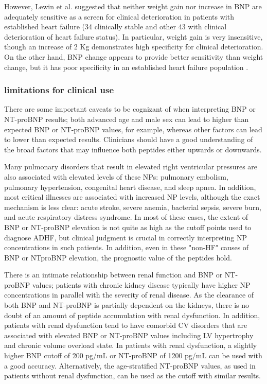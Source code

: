 \documentclass[14pt,a4paper,onecolumn]{extarticle}
\begin{document}
However, Lewin et al.  suggested that neither weight gain nor increase in BNP are adequately sensitive as a screen for clinical deterioration in patients with established heart failure (34 clinically stable and other 43 with clinical deterioration of heart failure status). In particular, weight gain is very insensitive, though an increase of 2 Kg demonstrates high specificity for clinical deterioration. On the other hand, BNP change appears to provide better sensitivity than weight change, but it has poor specificity in an established heart failure population \citep{bib3295}.

\clearpage
\subsubsection{limitations for clinical use}

There are some important caveats to be cognizant of when interpreting BNP or NT-proBNP results; both advanced age and male sex can lead to higher than expected BNP or NT-proBNP values, for example, whereas other factors can lead to lower than expected results. Clinicians should have a good understanding of the broad factors that may influence both peptides either upwards or downwards.\citep{Gaggin2014}

Many pulmonary disorders that result in elevated right ventricular pressures are also associated with elevated levels of these NPs: pulmonary embolism, pulmonary hypertension, congenital heart disease, and sleep apnea. In addition, most critical illnesses are associated with increased NP levels, although the exact mechanism is less clear: acute stroke, severe anemia, bacterial sepsis, severe burn, and acute respiratory distress syndrome. In most of these cases, the extent of BNP or NT-proBNP elevation is not quite as high as the cutoff points used to diagnose ADHF, but clinical judgment is crucial in correctly interpreting NP concentrations in such patients. In addition, even in these "non-HF" causes of BNP or NTproBNP elevation, the prognostic value of the peptides hold. \citep{Gaggin2014}

There is an intimate relationship between renal function and BNP or NT-proBNP values; patients with chronic kidney disease typically have higher NP concentrations in parallel with the severity of renal disease. As the clearance of both BNP and NT-proBNP is partially dependent on the kidneys, there is no doubt of an amount of peptide accumulation with renal dysfunction. In addition, patients with renal dysfunction tend to have comorbid CV disorders that are associated with elevated BNP or NT-proBNP values including LV hypertrophy and chronic volume overload state. In patients with renal dysfunction, a slightly higher BNP cutoff of 200 pg/mL or NT-proBNP of 1200 pg/mL can be used with a good accuracy. Alternatively, the age-stratified NT-proBNP values, as used in patients without renal dysfunction, can be used as the cutoff with similar results. \citep{Gaggin2014}
\end{document}
